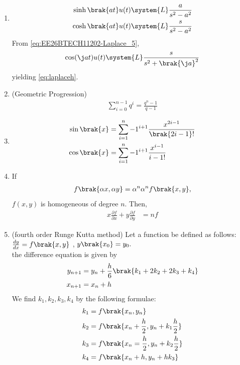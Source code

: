 \begin{enumerate}[label=\thesubsection.\arabic*,ref=\thesubsection.\theenumi]
\begin{align}
\label{eq:EE26BTECH11213-pmf-bern}
\end{align}
%
using the definition in \eqref{eq:EE26BTECH11213-mgf-def} along with
\eqref{eq:EE26BTECH11213-z_transform_def}.
\item
\begin{align}
\begin{split}
\sinh\brak{at}u(t)\system{L}\frac{a}{s^2-a^2}
\\
\cosh\brak{at}u(t)\system{L}\frac{s}{s^2-a^2}
\end{split}
\label{eq:laplaceh}
\end{align}
\solution
From 
\eqref{eq:EE26BTECH11202-Laplace_5},
\begin{align}
	\cos(\j at) u(t)\system{L} \frac{s}{s^2 + \brak{\j a}^2} 
\end{align}
yielding
\eqref{eq:laplaceh}.
%
\item (Geometric Progression)
\begin{align}
	\sum_{i=0}^{n-1}q^i=\frac{q^n-1}{q-1}
	\label{eq:sumofgp}
\end{align}
\item
\begin{align}
\begin{split}
	\sin\brak{x}&=\sum_{i=1}^{n}-1^{i+1}\frac{x^{2i-1}}{\brak{2i-1}!}\\
	\cos\brak{x}&=\sum_{i=1}^{n}-1^{i+1}\frac{x^{i-1}}{{i-1}!}
\end{split}
\label{eq:expansions}
\end{align}
\item If 
\begin{align}
	f\brak{\alpha x,\alpha y}= \alpha^n
	\alpha^nf\brak{x,y},
\end{align}
$f(x,y)$ is homogeneous of degree $n$.  Then,
\begin{align}
    x\frac{\partial f}{\partial x}+y\frac{\partial f}{\partial y}&=nf
    \label{eq:eulerhomo}
\end{align}
\item (fourth order Runge Kutta method)
	Let a function be defined as follows:\\
	$\frac{dy}{dx}=f\brak{x,y}$ , $y\brak{x_0}=y_0.$\\
	the difference equation is given by 
	\begin{align}
		y_{n+1}&=y_n+\frac{h}{6}\brak{k_1+2k_2+2k_3+k_4}\label{eq-rk4}\\
		x_{n+1}&=x_n+h
	\end{align}
	We find $k_1,k_2,k_3,k_4$ by the following formulae:
	\begin{align}
		k_1&=f\brak{x_n,y_n}\\
		k_2&=f\brak{x_n+\frac{h}{2},y_n+k_1\frac{h}{2}}\\
		k_3&=f\brak{x_n=\frac{h}{2},y_n+k_2\frac{h}{2}}\\
		k_4&=f\brak{x_n+h,y_n+hk_3}
	\end{align}	 
\end{enumerate}


